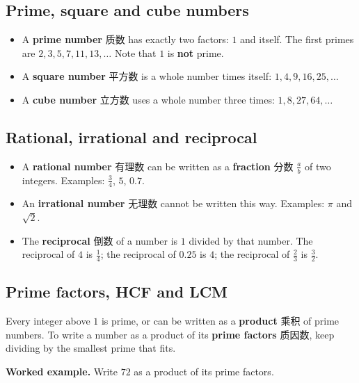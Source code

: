 \documentclass[11pt]{article}
\begin{document}
\subsection*{Prime, square and cube numbers}

\begin{itemize}
\item A \textbf{prime number} 质数 has exactly two factors: $1$ and itself. The first primes are $2, 3, 5, 7, 11, 13, \dots$ Note that $1$ is \textbf{not} prime.

\item A \textbf{square number} 平方数 is a whole number times itself: $1, 4, 9, 16, 25, \dots$

\item A \textbf{cube number} 立方数 uses a whole number three times: $1, 8, 27, 64, \dots$

\end{itemize}

\subsection*{Rational, irrational and reciprocal}

\begin{itemize}
\item A \textbf{rational number} 有理数 can be written as a \textbf{fraction} 分数 $\frac{a}{b}$ of two integers. Examples: $\frac{3}{4}$, $5$, $0.7$.

\item An \textbf{irrational number} 无理数 cannot be written this way. Examples: $\pi$ and $\sqrt{2}$.

\item The \textbf{reciprocal} 倒数 of a number is $1$ divided by that number. The reciprocal of $4$ is $\frac{1}{4}$; the reciprocal of $0.25$ is $4$; the reciprocal of $\frac{2}{3}$ is $\frac{3}{2}$.

\end{itemize}

\subsection*{Prime factors, HCF and LCM}

Every integer above $1$ is prime, or can be written as a \textbf{product} 乘积 of prime numbers. To write a number as a product of its \textbf{prime factors} 质因数, keep dividing by the smallest prime that fits.

\textbf{Worked example.} Write $72$ as a product of its prime factors.
\end{document}
